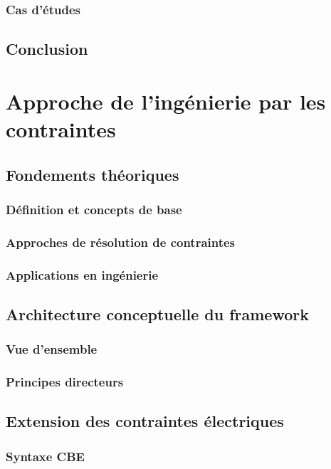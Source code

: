 \documentclass[a4paper,12pt]{article}
\begin{document}
\subsubsection{Cas d'études}
\label{sec:orgd53a2f6}
\subsection{Conclusion}
\label{sec:org3b93ee8}
\clearpage
\section{Approche de l'ingénierie par les contraintes}
\label{sec:orgd977fc3}
\subsection{Fondements théoriques}
\label{sec:org115dbf1}
\subsubsection{Définition et concepts de base}
\label{sec:orge1feb11}
\subsubsection{Approches de résolution de contraintes}
\label{sec:org6d6cd3c}
\subsubsection{Applications en ingénierie}
\label{sec:org452881a}
\subsection{Architecture conceptuelle du framework}
\label{sec:org37d5487}
\subsubsection{Vue d'ensemble}
\label{sec:orgb44c0c8}
\subsubsection{Principes directeurs}
\label{sec:org99711d5}
\subsection{Extension des contraintes électriques}
\label{sec:orge980b4a}
\subsubsection{Syntaxe CBE}
\label{sec:org787c88a}
\end{document}
